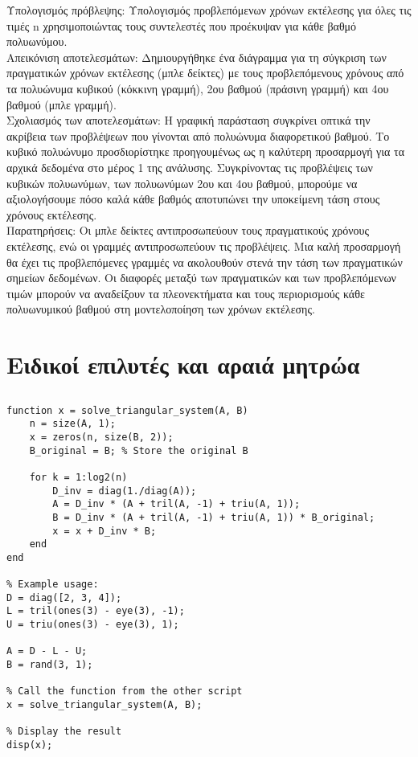 \documentclass[12pt,a4paper]{article}
\begin{document}
Υπολογισμός πρόβλεψης: Υπολογισμός προβλεπόμενων χρόνων εκτέλεσης για όλες τις τιμές n χρησιμοποιώντας τους συντελεστές που προέκυψαν για κάθε βαθμό πολυωνύμου.\\

Απεικόνιση αποτελεσμάτων: Δημιουργήθηκε ένα διάγραμμα για τη σύγκριση των πραγματικών χρόνων εκτέλεσης (μπλε δείκτες) με τους προβλεπόμενους χρόνους από τα πολυώνυμα κυβικού (κόκκινη γραμμή), 2ου βαθμού (πράσινη γραμμή) και 4ου βαθμού (μπλε γραμμή).\\

Σχολιασμός των αποτελεσμάτων: Η γραφική παράσταση συγκρίνει οπτικά την ακρίβεια των προβλέψεων που γίνονται από πολυώνυμα διαφορετικού βαθμού. Το κυβικό πολυώνυμο προσδιορίστηκε προηγουμένως ως η καλύτερη προσαρμογή για τα αρχικά δεδομένα στο μέρος 1 της ανάλυσης. Συγκρίνοντας τις προβλέψεις των κυβικών πολυωνύμων, των πολυωνύμων 2ου και 4ου βαθμού, μπορούμε να αξιολογήσουμε πόσο καλά κάθε βαθμός αποτυπώνει την υποκείμενη τάση στους χρόνους εκτέλεσης.\\

Παρατηρήσεις: Οι μπλε δείκτες αντιπροσωπεύουν τους πραγματικούς χρόνους εκτέλεσης, ενώ οι γραμμές αντιπροσωπεύουν τις προβλέψεις. Μια καλή προσαρμογή θα έχει τις προβλεπόμενες γραμμές να ακολουθούν στενά την τάση των πραγματικών σημείων δεδομένων. Οι διαφορές μεταξύ των πραγματικών και των προβλεπόμενων τιμών μπορούν να αναδείξουν τα πλεονεκτήματα και τους περιορισμούς κάθε πολυωνυμικού βαθμού στη μοντελοποίηση των χρόνων εκτέλεσης.

\section{Ειδικοί επιλυτές και αραιά μητρώα}
\subsection{}
\begin{verbatim}
function x = solve_triangular_system(A, B)
    n = size(A, 1);
    x = zeros(n, size(B, 2));
    B_original = B; % Store the original B

    for k = 1:log2(n)
        D_inv = diag(1./diag(A));
        A = D_inv * (A + tril(A, -1) + triu(A, 1));
        B = D_inv * (A + tril(A, -1) + triu(A, 1)) * B_original;
        x = x + D_inv * B;
    end
end

% Example usage:
D = diag([2, 3, 4]);
L = tril(ones(3) - eye(3), -1);
U = triu(ones(3) - eye(3), 1);

A = D - L - U;
B = rand(3, 1);

% Call the function from the other script
x = solve_triangular_system(A, B);

% Display the result
disp(x);
\end{verbatim}
\end{document}
